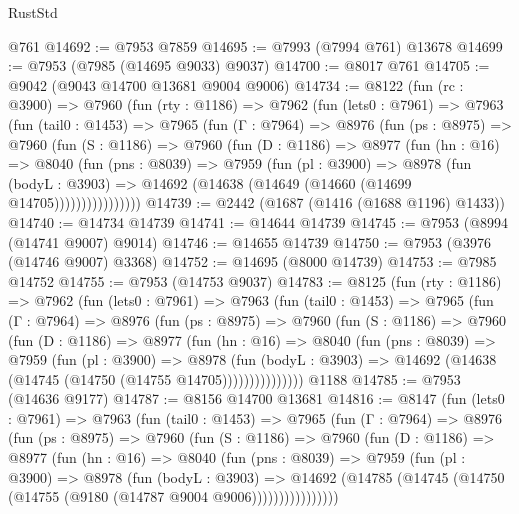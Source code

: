 \begin{lexlean}{RustStd}
\begin{coremodule}
    @761
@14692 := @7953 @7859
@14695 := @7993 (@7994 @761) @13678
@14699 := @7953 (@7985 (@14695 @9033) @9037)
@14700 := @8017 @761
@14705 := @9042 (@9043 @14700 @13681 @9004 @9006)
@14734 := @8122
    (fun (rc : @3900) =>
    @7960
      (fun (rty : @1186) =>
      @7962
        (fun (lets0 : @7961) =>
        @7963
          (fun (tail0 : @1453) =>
          @7965
            (fun (Γ : @7964) =>
            @8976
              (fun (ps : @8975) =>
              @7960
                (fun (S : @1186) =>
                @7960
                  (fun (D : @1186) =>
                  @8977
                    (fun (hn : @16) =>
                    @8040
                      (fun (pns : @8039) =>
                      @7959
                        (fun (pl : @3900) =>
                        @8978
                          (fun (bodyL : @3903) =>
                          @14692 (@14638 (@14649 (@14660 (@14699 @14705))))))))))))))))
@14739 := @2442 (@1687 (@1416 (@1688 @1196) @1433))
@14740 := @14734 @14739
@14741 := @14644 @14739
@14745 := @7953 (@8994 (@14741 @9007) @9014)
@14746 := @14655 @14739
@14750 := @7953 (@3976 (@14746 @9007) @3368)
@14752 := @14695 (@8000 @14739)
@14753 := @7985 @14752
@14755 := @7953 (@14753 @9037)
@14783 := @8125
    (fun (rty : @1186) =>
    @7962
      (fun (lets0 : @7961) =>
      @7963
        (fun (tail0 : @1453) =>
        @7965
          (fun (Γ : @7964) =>
          @8976
            (fun (ps : @8975) =>
            @7960
              (fun (S : @1186) =>
              @7960
                (fun (D : @1186) =>
                @8977
                  (fun (hn : @16) =>
                  @8040
                    (fun (pns : @8039) =>
                    @7959
                      (fun (pl : @3900) =>
                      @8978
                        (fun (bodyL : @3903) =>
                        @14692 (@14638 (@14745 (@14750 (@14755 @14705)))))))))))))))
    @1188
@14785 := @7953 (@14636 @9177)
@14787 := @8156 @14700 @13681
@14816 := @8147
    (fun (lets0 : @7961) =>
    @7963
      (fun (tail0 : @1453) =>
      @7965
        (fun (Γ : @7964) =>
        @8976
          (fun (ps : @8975) =>
          @7960
            (fun (S : @1186) =>
            @7960
              (fun (D : @1186) =>
              @8977
                (fun (hn : @16) =>
                @8040
                  (fun (pns : @8039) =>
                  @7959
                    (fun (pl : @3900) =>
                    @8978
                      (fun (bodyL : @3903) =>
                      @14692
                        (@14785 (@14745 (@14750 (@14755 (@9180 (@14787 @9004 @9006))))))))))))))))

\end{coremodule}
\end{lexlean}
